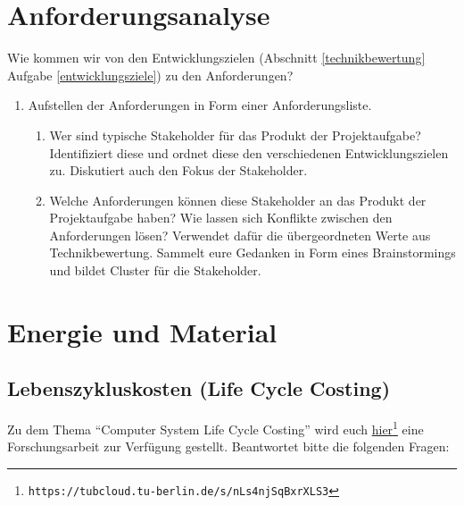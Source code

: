 \documentclass[DIV=15,headinclude=true]{scrartcl}
\begin{document}
\section{Anforderungsanalyse}

Wie kommen wir von den Entwicklungszielen (Abschnitt \ref{technikbewertung} Aufgabe
\ref{entwicklungsziele}) zu den Anforderungen?

\begin{enumerate}
	\item
	      Aufstellen der Anforderungen in Form einer Anforderungsliste.

	      \begin{enumerate}
		      \item
		            Wer sind typische Stakeholder für das Produkt der Projektaufgabe?
		            Identifiziert diese und ordnet diese den verschiedenen
		            Entwicklungszielen zu. Diskutiert auch den Fokus der Stakeholder.
		      \item
		            Welche Anforderungen können diese Stakeholder an das Produkt der
		            Projektaufgabe haben? Wie lassen sich Konflikte zwischen den
		            Anforderungen lösen? Verwendet dafür die übergeordneten Werte aus
		            Technikbewertung. Sammelt eure Gedanken in Form eines Brainstormings
		            und bildet Cluster für die Stakeholder.
	      \end{enumerate}
\end{enumerate}

\section{Energie und Material}

\subsection{Lebenszykluskosten (Life Cycle Costing)}

Zu dem Thema "`Computer System Life Cycle Costing"' wird euch
\href{https://tubcloud.tu-berlin.de/s/nLs4njSqBxrXLS3}{hier}\footnote{\texttt{https://tubcloud.tu-berlin.de/s/nLs4njSqBxrXLS3}}
eine Forschungsarbeit zur Verfügung gestellt. Beantwortet bitte die
folgenden Fragen:
\end{document}

